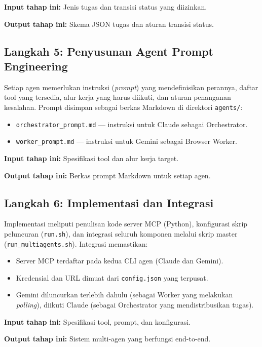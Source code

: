 \textbf{Input tahap ini:} Jenis tugas dan transisi status yang diizinkan.

\textbf{Output tahap ini:} Skema JSON tugas dan aturan transisi status.

\subsection{Langkah 5: Penyusunan Agent Prompt Engineering}

Setiap agen memerlukan instruksi (\textit{prompt}) yang mendefinisikan perannya, daftar tool yang tersedia, alur kerja yang harus diikuti, dan aturan penanganan kesalahan. Prompt disimpan sebagai berkas Markdown di direktori \texttt{agents/}:
\begin{itemize}
  \item \texttt{orchestrator\_prompt.md} --- instruksi untuk Claude sebagai Orchestrator.
  \item \texttt{worker\_prompt.md} --- instruksi untuk Gemini sebagai Browser Worker.
\end{itemize}

\textbf{Input tahap ini:} Spesifikasi tool dan alur kerja target.

\textbf{Output tahap ini:} Berkas prompt Markdown untuk setiap agen.

\subsection{Langkah 6: Implementasi dan Integrasi}

Implementasi meliputi penulisan kode server MCP (Python), konfigurasi skrip peluncuran (\texttt{run.sh}), dan integrasi seluruh komponen melalui skrip master (\texttt{run\_multiagents.sh}). Integrasi memastikan:
\begin{itemize}
  \item Server MCP terdaftar pada kedua CLI agen (Claude dan Gemini).
  \item Kredensial dan URL dimuat dari \texttt{config.json} yang terpusat.
  \item Gemini diluncurkan terlebih dahulu (sebagai Worker yang melakukan \textit{polling}), diikuti Claude (sebagai Orchestrator yang mendistribusikan tugas).
\end{itemize}

\textbf{Input tahap ini:} Spesifikasi tool, prompt, dan konfigurasi.

\textbf{Output tahap ini:} Sistem multi-agen yang berfungsi end-to-end.

